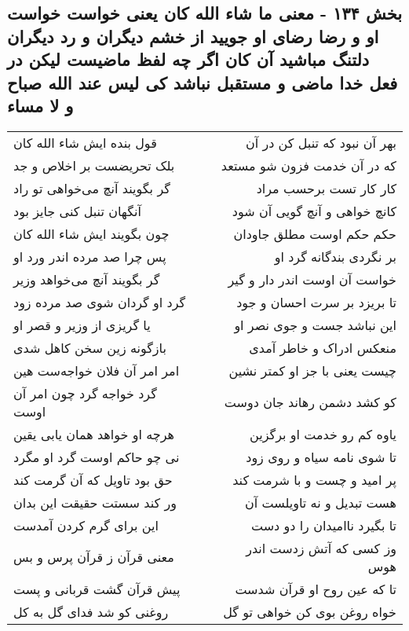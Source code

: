 \begin{center}
\section*{بخش ۱۳۴ - معنی ما شاء الله کان یعنی خواست خواست او و رضا رضای او جویید از خشم دیگران و رد دیگران دلتنگ مباشید آن کان اگر چه لفظ ماضیست لیکن در فعل خدا ماضی و مستقبل نباشد کی لیس  عند الله صباح و لا مساء}
\label{sec:sh134}
\begin{longtable}{l p{0.5cm} r}
قول بنده ایش شاء الله کان
&&
بهر آن نبود که تنبل کن در آن
\\
بلک تحریضست بر اخلاص و جد
&&
که در آن خدمت فزون شو مستعد
\\
گر بگویند آنچ می‌خواهی تو راد
&&
کار کار تست برحسب مراد
\\
آنگهان تنبل کنی جایز بود
&&
کانچ خواهی و آنچ گویی آن شود
\\
چون بگویند ایش شاء الله کان
&&
حکم حکم اوست مطلق جاودان
\\
پس چرا صد مرده اندر ورد او
&&
بر نگردی بندگانه گرد او
\\
گر بگویند آنچ می‌خواهد وزیر
&&
خواست آن اوست اندر دار و گیر
\\
گرد او گردان شوی صد مرده زود
&&
تا بریزد بر سرت احسان و جود
\\
یا گریزی از وزیر و قصر او
&&
این نباشد جست و جوی نصر او
\\
بازگونه زین سخن کاهل شدی
&&
منعکس ادراک و خاطر آمدی
\\
امر امر آن فلان خواجه‌ست هین
&&
چیست یعنی با جز او کمتر نشین
\\
گرد خواجه گرد چون امر آن اوست
&&
کو کشد دشمن رهاند جان دوست
\\
هرچه او خواهد همان یابی یقین
&&
یاوه کم رو خدمت او برگزین
\\
نی چو حاکم اوست گرد او مگرد
&&
تا شوی نامه سیاه و روی زود
\\
حق بود تاویل که آن گرمت کند
&&
پر امید و چست و با شرمت کند
\\
ور کند سستت حقیقت این بدان
&&
هست تبدیل و نه تاویلست آن
\\
این برای گرم کردن آمدست
&&
تا بگیرد ناامیدان را دو دست
\\
معنی قرآن ز قرآن پرس و بس
&&
وز کسی که آتش زدست اندر هوس
\\
پیش قرآن گشت قربانی و پست
&&
تا که عین روح او قرآن شدست
\\
روغنی کو شد فدای گل به کل
&&
خواه روغن بوی کن خواهی تو گل
\\
\end{longtable}
\end{center}
